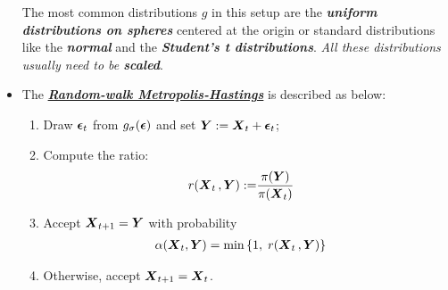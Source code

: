\documentclass[11pt]{article}
\begin{document}
\begin{itemize}
The most common distributions $g$ in this setup are the \emph{\textbf{uniform distributions on spheres}} centered at the origin or standard distributions like the \emph{\textbf{normal}} and the \emph{\textbf{Student's t distributions}}. \emph{All these distributions usually need to be \textbf{scaled}}.


\item The \underline{\emph{\textbf{Random-walk Metropolis-Hastings}}} is described as below:
\begin{enumerate}
\item Draw $\boldsymbol{\epsilon}_{t}$ from $g_{\sigma}(\boldsymbol{\epsilon})$ and set $\boldsymbol{Y} := \boldsymbol{X}_{t} + \boldsymbol{\epsilon}_{t}$;

\item Compute the ratio:
\begin{align}
r(\boldsymbol{X}_{t}\,, \boldsymbol{Y}):= &\frac{\pi(\boldsymbol{Y})}{\pi(\boldsymbol{X}_{t})} \label{eqn: rw_ratio}
\end{align}

\item Accept $\boldsymbol{X}_{t+1} = \boldsymbol{Y}$ with probability 
\begin{align*}
\alpha(\boldsymbol{X}_{t}, \boldsymbol{Y}) &= \min\left\{1,\;r(\boldsymbol{X}_{t}\,, \boldsymbol{Y})\right\}
\end{align*}

\item Otherwise, accept $\boldsymbol{X}_{t+1} = \boldsymbol{X}_{t}$.
\end{enumerate}
\end{itemize}
\end{document}
